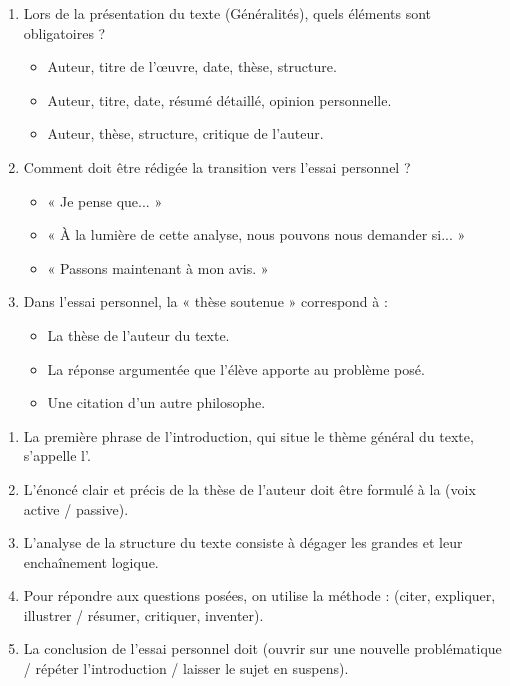 \documentclass[11pt]{article}
\begin{document}
\begin{exercice}
\begin{enumerate}
    \item Lors de la présentation du texte (Généralités), quels éléments sont obligatoires ?
    \begin{itemize}
        \item[A.] Auteur, titre de l'œuvre, date, thèse, structure.
        \item[B.] Auteur, titre, date, résumé détaillé, opinion personnelle.
        \item[C.] Auteur, thèse, structure, critique de l'auteur.
    \end{itemize}
    \item Comment doit être rédigée la transition vers l'essai personnel ?
    \begin{itemize}
        \item[A.] « Je pense que... »
        \item[B.] « À la lumière de cette analyse, nous pouvons nous demander si... »
        \item[C.] « Passons maintenant à mon avis. »
    \end{itemize}
    \item Dans l'essai personnel, la « thèse soutenue » correspond à :
    \begin{itemize}
        \item[A.] La thèse de l'auteur du texte.
        \item[B.] La réponse argumentée que l'élève apporte au problème posé.
        \item[C.] Une citation d'un autre philosophe.
    \end{itemize}
\end{enumerate}
\end{exercice}

\begin{exercice}
\begin{enumerate}
    \item La première phrase de l'introduction, qui situe le thème général du texte, s'appelle l'\underline{\hspace{4cm}}.
    \item L'énoncé clair et précis de la thèse de l'auteur doit être formulé à la \underline{\hspace{4cm}} (voix active / passive).
    \item L'analyse de la structure du texte consiste à dégager les grandes \underline{\hspace{4cm}} et leur enchaînement logique.
    \item Pour répondre aux questions posées, on utilise la méthode : \underline{\hspace{4cm}} (citer, expliquer, illustrer / résumer, critiquer, inventer).
    \item La conclusion de l'essai personnel doit \underline{\hspace{4cm}} (ouvrir sur une nouvelle problématique / répéter l'introduction / laisser le sujet en suspens).
\end{enumerate}
\end{exercice}
\end{document}
